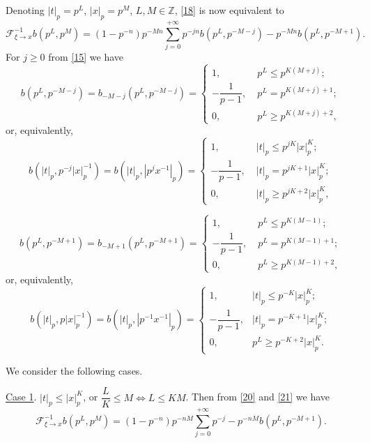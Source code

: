 \documentclass[14pt]{article}
\theoremstyle{theorem}
\theoremstyle{theorem}
\theoremstyle{definition}
\theoremstyle{lemma}
\newcommand{\Label}[1]{\label{#1}}
\numberwithin{equation}{section}
\begin{document}
Denoting $|t|_p=p^L$, $|x|_p=p^M$, $L,M\in\mathbb{Z}$, \eqref{18} is now equivalent to
\begin{equation}\Label{19}
\mathcal{F}_{\xi\to x}^{-1}b(p^L,p^M)=(1-p^{-n})p^{-Mn}\sum\limits_{j=0}^{+\infty}p^{-jn}b(p^L,p^{-M-j})
-p^{-Mn}b(p^L,p^{-M+1}).
\end{equation}
For $j\geq0$ from \eqref{15} we have
\begin{equation}\Label{20}
b(p^L,p^{-M-j})=b_{-M-j}(p^L,p^{-M-j})=
\left\{
\begin{array}{ll}
1,\;&p^L\leq p^{K(M+j)};\\
-\dfrac{1}{p-1},\;&p^L=p^{K(M+j)+1};\\
0,\;&p^L\geq p^{K(M+j)+2},
\end{array}
\right.
\end{equation}
or, equivalently,
\begin{equation}\Label{20'}
b(|t|_p,p^{-j}|x|_p^{-1})=b(|t|_p,|p^jx^{-1}|_p)=
\left\{
\begin{array}{ll}
1,\;&|t|_p\leq p^{jK}|x|_p^K;\\
-\dfrac{1}{p-1},\;&|t|_p=p^{jK+1}|x|_p^K;\\
0,\;&|t|_p\geq p^{jK+2}|x|_p^K,
\end{array}
\right.
\end{equation}

\begin{equation}\Label{21}
b(p^L,p^{-M+1})=b_{-M+1}(p^L,p^{-M+1})=
\left\{
\begin{array}{ll}
1,\;&p^L\leq p^{K(M-1)};\\
-\dfrac{1}{p-1},\;&p^L=p^{K(M-1)+1};\\
0,\;&p^L\geq p^{K(M-1)+2},
\end{array}
\right.
\end{equation}
or, equivalently,
\begin{equation}\Label{21'}
b(|t|_p,p|x|_p^{-1})=b(|t|_p,|p^{-1}x^{-1}|_p)=
\left\{
\begin{array}{ll}
1,\;&|t|_p\leq p^{-K}|x|_p^K;\\
-\dfrac{1}{p-1},&|t|_p=p^{-K+1}|x|_p^K;\\
0,\;&p^L\geq p^{-K+2}|x|_p^K.
\end{array}
\right.
\end{equation}

We consider the following cases.

\underline{Case 1}. $|t|_p\leq|x|_p^K$, or $\dfrac{L}{K}\leq M\Longleftrightarrow L\leq KM$. Then from \eqref{20} and \eqref{21} we have
\begin{equation}\Label{22}
\mathcal{F}_{\xi\to x}^{-1}b(p^L,p^M)=(1-p^{-n})p^{-nM}\sum\limits_{j=0}^{+\infty}p^{-j}-p^{-nM}b(p^L,p^{-M+1}).
\end{equation}
\end{document}
